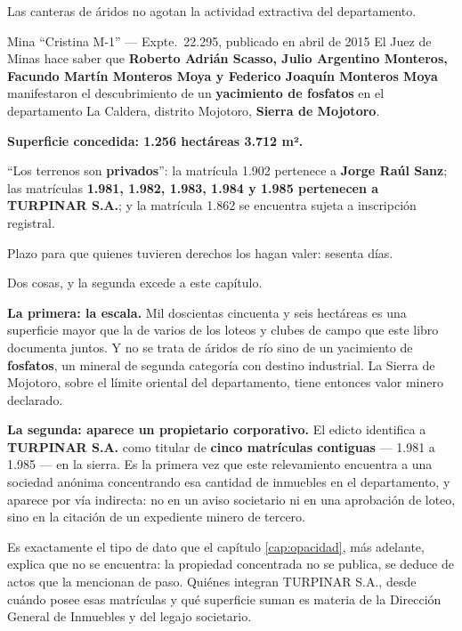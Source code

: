 Las canteras de áridos no agotan la actividad extractiva del departamento.

\begin{ficha}{Mina ``Cristina M-1'' --- Expte.\ 22.295, publicado en abril de 2015}
El Juez de Minas hace saber que \textbf{Roberto Adrián Scasso, Julio Argentino Monteros, Facundo Martín Monteros Moya y Federico Joaquín Monteros Moya} manifestaron el descubrimiento de un \textbf{yacimiento de fosfatos} en el departamento La Caldera, distrito Mojotoro, \textbf{Sierra de Mojotoro}.

\textbf{Superficie concedida: 1.256 hectáreas 3.712 m².}

``Los terrenos son \textbf{privados}'': la matrícula 1.902 pertenece a \textbf{Jorge Raúl Sanz}; las matrículas \textbf{1.981, 1.982, 1.983, 1.984 y 1.985 pertenecen a TURPINAR S.A.}; y la matrícula 1.862 se encuentra sujeta a inscripción registral.

Plazo para que quienes tuvieren derechos los hagan valer: sesenta días.
\end{ficha}

Dos cosas, y la segunda excede a este capítulo.

\textbf{La primera: la escala.} Mil doscientas cincuenta y seis hectáreas es una superficie mayor que la de varios de los loteos y clubes de campo que este libro documenta juntos. Y no se trata de áridos de río sino de un yacimiento de \textbf{fosfatos}, un mineral de segunda categoría con destino industrial. La Sierra de Mojotoro, sobre el límite oriental del departamento, tiene entonces valor minero declarado.

\textbf{La segunda: aparece un propietario corporativo.} El edicto identifica a \textbf{TURPINAR S.A.} como titular de \textbf{cinco matrículas contiguas} --- 1.981 a 1.985 --- en la sierra. Es la primera vez que este relevamiento encuentra a una sociedad anónima concentrando esa cantidad de inmuebles en el departamento, y aparece por vía indirecta: no en un aviso societario ni en una aprobación de loteo, sino en la citación de un expediente minero de tercero.

Es exactamente el tipo de dato que el capítulo \ref{cap:opacidad}, más adelante, explica que no se encuentra: la propiedad concentrada no se publica, se deduce de actos que la mencionan de paso. Quiénes integran TURPINAR S.A., desde cuándo posee esas matrículas y qué superficie suman es materia de la Dirección General de Inmuebles y del legajo societario.

